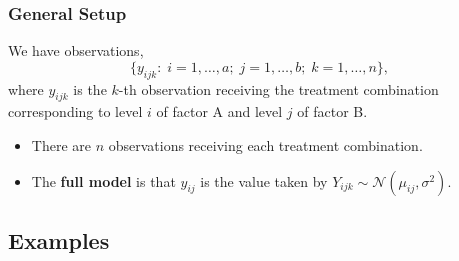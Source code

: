 \documentclass[a4paper]{article}
\begin{document}
\subsubsection{General Setup}
We have observations,
\[
	\{y_{ijk}:\;i=1,\dotsc,a;\;j=1,\dotsc,b;\;k=1,\dotsc,n\},
\]
where \( y_{ijk} \) is the \( k \)-th observation receiving the treatment combination corresponding to level \( i \) of factor A and level \( j \) of factor B.
\begin{itemize}
	\item There are \( n \) observations receiving each treatment combination.
	\item The \textbf{full model} is that \( y_{ij} \) is the value taken by \( Y_{ijk} \sim \mathcal{N} (\mu_{ij}, \sigma^2) \). 
\end{itemize}
\subsection{Examples}
\end{document}
